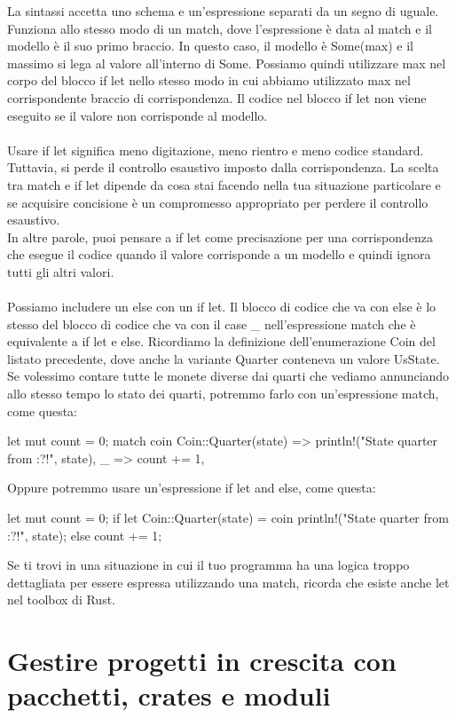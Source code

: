 \documentclass[11pt,a4paper]{article}
\begin{document}
La sintassi accetta uno schema e un'espressione separati da un segno di uguale. Funziona allo stesso modo di un match, dove l'espressione è data al match e il modello è il suo primo braccio. In questo caso, il modello è Some(max) e il massimo si lega al valore all'interno di Some. Possiamo quindi utilizzare max nel corpo del blocco if let nello stesso modo in cui abbiamo utilizzato max nel corrispondente braccio di corrispondenza. Il codice nel blocco if let non viene eseguito se il valore non corrisponde al modello.\\
\\
Usare if let significa meno digitazione, meno rientro e meno codice standard. Tuttavia, si perde il controllo esaustivo imposto dalla corrispondenza. La scelta tra match e if let dipende da cosa stai facendo nella tua situazione particolare e se acquisire concisione è un compromesso appropriato per perdere il controllo esaustivo.\\
In altre parole, puoi pensare a if let come precisazione per una corrispondenza che esegue il codice quando il valore corrisponde a un modello e quindi ignora tutti gli altri valori.\\
\\
Possiamo includere un else con un if let. Il blocco di codice che va con else è lo stesso del blocco di codice che va con il case \_ nell'espressione match che è equivalente a if let e else. Ricordiamo la definizione dell'enumerazione Coin del listato precedente, dove anche la variante Quarter conteneva un valore UsState. Se volessimo contare tutte le monete diverse dai quarti che vediamo annunciando allo stesso tempo lo stato dei quarti, potremmo farlo con un'espressione match, come questa:

\begin{rust}
let mut count = 0;
match coin {
  Coin::Quarter(state) => println!("State quarter from {:?}!", state),
  _ => count += 1,
}
\end{rust}
Oppure potremmo usare un'espressione if let and else, come questa:
\begin{rust}
    let mut count = 0;
    if let Coin::Quarter(state) = coin {
        println!("State quarter from {:?}!", state);
    } else {
        count += 1;
    }
\end{rust}
Se ti trovi in una situazione in cui il tuo programma ha una logica troppo dettagliata per essere espressa utilizzando una match, ricorda che esiste anche let nel toolbox di Rust.

\section{Gestire progetti in crescita con pacchetti, crates e moduli}
\end{document}
